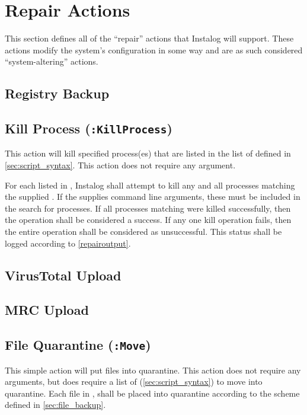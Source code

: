 \section{Repair Actions} \label{sec:repair_actions}
This section defines all of the ``repair'' actions that Instalog will support. 
These actions modify the system's configuration in some way and are as such
considered ``system-altering'' actions. \label{systemaltering}

\subsection{Registry Backup}

\subsection{Kill Process (\texttt{:KillProcess})}
This action will kill specified process(es) that are listed in the list of
 defined in \ref{sec:script_syntax}.  This action does not require
any argument.  

For each  listed in , Instalog shall attempt to kill any
and all processes matching the supplied .  If the 
supplies command line arguments, these must be included in the search for
processes.  If all processes matching  were killed successfully,
then the operation shall be considered a success.  If any one kill operation
fails, then the entire operation shall be considered as unsuccessful.  This
status shall be logged according to \ref{repairoutput}.

\subsection{VirusTotal Upload}

\subsection{MRC Upload}

\subsection{File Quarantine (\texttt{:Move})}
This simple action will put files into quarantine.  This action does not require
any arguments, but does require a list of  (\ref{sec:script_syntax})
to move into quarantine.  Each file in , shall be placed into
quarantine according to the scheme defined in \ref{sec:file_backup}.


